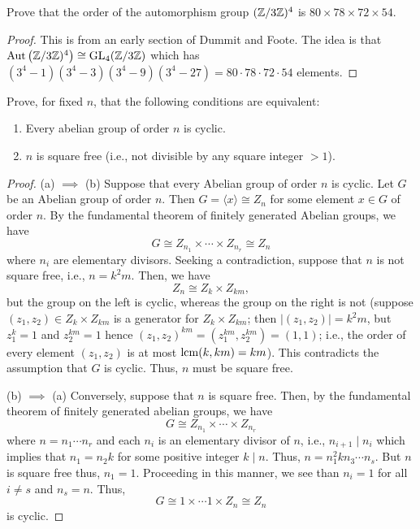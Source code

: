 \begin{problem}
Prove that the order of the automorphism group $(\mathbb{Z}/3\mathbb{Z})^4$
is $80\times 78\times 72\times 54$.
\end{problem}
\begin{proof}
This is from an early section of Dummit and Foote. The idea is that
$\operatorname{Aut}\left(\mathbb{Z}/3\mathbb{Z})^4\right)\cong\operatorname{GL}_4(\mathbb{Z}/3\mathbb{Z})$ which has
$(3^4-1)(3^4-3)(3^4-9)(3^4-27)=80\cdot 78\cdot 72\cdot 54$ elements.
\end{proof}

\begin{problem}
Prove, for fixed $n$, that the following conditions are
equivalent:
\begin{enumerate}[label=(\alph*)]
\item Every abelian group of order $n$ is cyclic.
\item $n$ is square free (i.e., not divisible by any square
integer $>1$).
\end{enumerate}
\end{problem}
\begin{proof}
(a) $\implies$ (b) Suppose that every Abelian group of order $n$ is
cyclic. Let $G$ be an Abelian group of order $n$. Then $G=\langle
x\rangle\cong Z_n$ for some element $x\in G$ of order $n$. By the
fundamental theorem of finitely generated Abelian groups, we have
\[
G\cong Z_{n_1}\times\cdots\times Z_{n_r}\cong Z_n
\]
where $n_i$ are elementary divisors. Seeking a contradiction, suppose that
$n$ is not square free, i.e., $n=k^2m$. Then, we have
\[
Z_n\cong Z_k\times Z_{km},
\]
but the group on the left is cyclic, whereas the group on the right is not
(suppose $(z_1,z_2)\in Z_k\times Z_{km}$ is a generator for $Z_k\times
Z_{km}$; then $|(z_1,z_2)|=k^2m$, but $z_1^k=1$ and $z_2^{km}=1$ hence
$(z_1,z_2)^{km}=(z_1^{km},z_2^{km})=(1,1)$; i.e., the order of every
element $(z_1,z_2)$ is at most $\operatorname{lcm}(k,km)=km$). This contradicts the
assumption that $G$ is cyclic. Thus, $n$ must be square free.

(b) $\implies$ (a) Conversely, suppose that $n$ is square free. Then, by
the fundamental theorem of finitely generated abelian groups, we have
\[
G\cong Z_{n_1}\times\cdots\times Z_{n_r}
\]
where $n=n_1\cdots n_r$ and each $n_i$ is an elementary divisor of $n$,
i.e., $n_{i+1}\mid n_i$ which implies that $n_1=n_2 k$ for some
positive integer $k\mid n$. Thus, $n=n_1^2k n_3\cdots n_s$. But $n$ is
square free thus, $n_1=1$. Proceeding in this manner, we see than $n_i=1$
for all $i\neq s$ and $n_s=n$. Thus,
\[
G\cong 1\times\cdots 1\times Z_n\cong Z_n
\]
is cyclic.
\end{proof}

